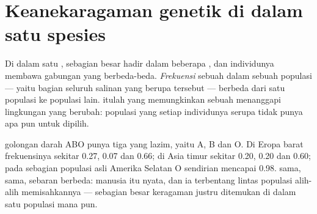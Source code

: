 \section{Keanekaragaman genetik di dalam satu spesies}

\begin{proposition}\label{prop:g10:biodiversity-scales:genetic}
Di dalam satu , sebagian besar  hadir dalam beberapa ,
dan individunya membawa gabungan  yang berbeda-beda.
\emph{Frekuensi} sebuah  dalam sebuah populasi --- yaitu bagian
seluruh salinan  yang berupa  tersebut --- berbeda dari satu
populasi ke populasi lain.  itulah yang
memungkinkan sebuah  menanggapi lingkungan yang berubah:
populasi yang setiap individunya serupa tidak punya apa pun untuk dipilih.
\end{proposition}
\admitted

\begin{example}\label{ex:g10:biodiversity-scales:abo}
 golongan darah ABO punya tiga  yang lazim, yaitu A, B dan O.
Di Eropa barat frekuensinya sekitar 0.27, 0.07 dan 0.66; di Asia timur
sekitar 0.20, 0.20 dan 0.60; pada sebagian populasi asli Amerika
Selatan  O sendirian mencapai 0.98.  sama,  sama, sebaran
 berbeda:  manusia itu nyata, dan ia
terbentang lintas populasi alih-alih memisahkannya --- sebagian besar
keragaman  justru ditemukan di dalam satu populasi mana pun.
\end{example}

